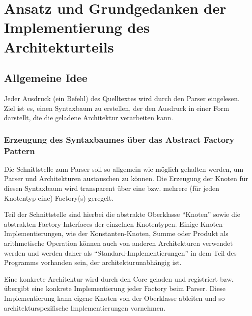 
\section{Ansatz und Grundgedanken der Implementierung des Architekturteils}
\subsection{Allgemeine Idee}
Jeder Ausdruck (ein Befehl) des Quelltextes wird durch den Parser eingelesen. Ziel ist es, einen Syntaxbaum zu erstellen, der den Ausdruck in einer Form darstellt, die die geladene Architektur verarbeiten kann.

\subsubsection{Erzeugung des Syntaxbaumes über das Abstract Factory Pattern}
Die Schnittstelle zum Parser soll so allgemein wie möglich gehalten werden, um Parser und Architekturen austauschen zu können. Die Erzeugung der Knoten für diesen Syntaxbaum wird transparent über eine bzw. mehrere (für jeden Knotentyp eine) Factory(s) geregelt.

Teil der Schnittstelle sind hierbei die abstrakte Oberklasse ``Knoten'' sowie die abstrakten Factory-Interfaces der einzelnen Knotentypen. Einige Knoten-Implementierungen, wie der Konstanten-Knoten, Summe oder Produkt als arithmetische Operation können auch von anderen Architekturen verwendet werden und werden daher als ``Standard-Implementierungen'' in dem Teil des Programms vorhanden sein, der architekturunabhängig ist.

Eine konkrete Architektur wird durch den Core geladen und registriert bzw. übergibt eine konkrete Implementierung jeder Factory beim Parser. Diese Implementierung kann eigene Knoten von der Oberklasse ableiten und so architekturspezifische Implementierungen vornehmen.

